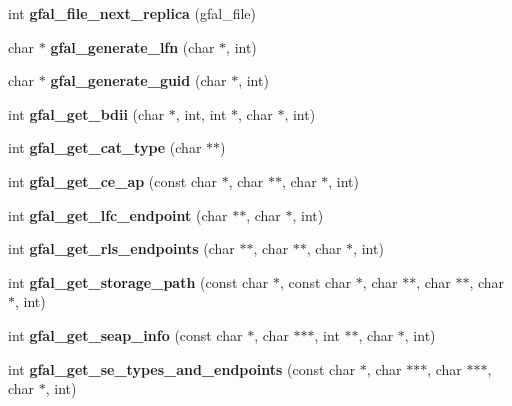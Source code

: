 \begin{CompactItemize}
\item 
int \textbf{gfal\_\-file\_\-next\_\-replica} (gfal\_\-file)\label{group__internal__group_g6de434f3dc9aef814ca6d67c40febbbe}

\item 
char $\ast$ \textbf{gfal\_\-generate\_\-lfn} (char $\ast$, int)\label{group__internal__group_gcd48b57bf9659be5204319918c6f9d20}

\item 
char $\ast$ \textbf{gfal\_\-generate\_\-guid} (char $\ast$, int)\label{group__internal__group_g8311ede197e204e57029165fbc3898d6}

\item 
int \textbf{gfal\_\-get\_\-bdii} (char $\ast$, int, int $\ast$, char $\ast$, int)\label{group__internal__group_gc5a167111fbd4564bdbd7a194a8ebbad}

\item 
int \textbf{gfal\_\-get\_\-cat\_\-type} (char $\ast$$\ast$)\label{group__internal__group_gc08ad608f2ca57ec2883c799a3b6bf11}

\item 
int \textbf{gfal\_\-get\_\-ce\_\-ap} (const char $\ast$, char $\ast$$\ast$, char $\ast$, int)\label{group__internal__group_ged7eddae06a6ae76e7835ad89069f23f}

\item 
int \textbf{gfal\_\-get\_\-lfc\_\-endpoint} (char $\ast$$\ast$, char $\ast$, int)\label{group__internal__group_g6b5c96e786925f6ad93fa57f998173cc}

\item 
int \textbf{gfal\_\-get\_\-rls\_\-endpoints} (char $\ast$$\ast$, char $\ast$$\ast$, char $\ast$, int)\label{group__internal__group_ge98063cb83cedc1a6e6fe0ef8d35c447}

\item 
int \textbf{gfal\_\-get\_\-storage\_\-path} (const char $\ast$, const char $\ast$, char $\ast$$\ast$, char $\ast$$\ast$, char $\ast$, int)\label{group__internal__group_gb3f2c6e488fd2ede0d16bd7f4cdd3549}

\item 
int \textbf{gfal\_\-get\_\-seap\_\-info} (const char $\ast$, char $\ast$$\ast$$\ast$, int $\ast$$\ast$, char $\ast$, int)\label{group__internal__group_ge114394c3fd91f2ab9382dd884dd0693}

\item 
int \textbf{gfal\_\-get\_\-se\_\-types\_\-and\_\-endpoints} (const char $\ast$, char $\ast$$\ast$$\ast$, char $\ast$$\ast$$\ast$, char $\ast$, int)\label{group__internal__group_g2c87f70238deffb3907d5a612e847fd4}

\end{CompactItemize}
